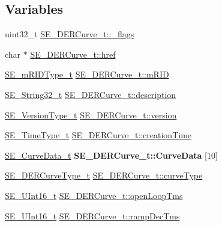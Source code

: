 \subsection*{Variables}
\begin{DoxyCompactItemize}
\item 
uint32\+\_\+t \hyperlink{group__DERCurve_gaed4a71593a5f29f29c53fda240e616e4}{S\+E\+\_\+\+D\+E\+R\+Curve\+\_\+t\+::\+\_\+flags}
\item 
char $\ast$ \hyperlink{group__DERCurve_gae8312bc271b89dbee978056bd65b12bf}{S\+E\+\_\+\+D\+E\+R\+Curve\+\_\+t\+::href}
\item 
\hyperlink{group__mRIDType_gac74622112f3a388a2851b2289963ba5e}{S\+E\+\_\+m\+R\+I\+D\+Type\+\_\+t} \hyperlink{group__DERCurve_gae779658d736d0fcca90bbe1f932ed0b8}{S\+E\+\_\+\+D\+E\+R\+Curve\+\_\+t\+::m\+R\+ID}
\item 
\hyperlink{group__String32_gac9f59b06b168b4d2e0d45ed41699af42}{S\+E\+\_\+\+String32\+\_\+t} \hyperlink{group__DERCurve_ga895686dd6b59302a6afd6695d01db9d9}{S\+E\+\_\+\+D\+E\+R\+Curve\+\_\+t\+::description}
\item 
\hyperlink{group__VersionType_ga4b8d27838226948397ed99f67d46e2ae}{S\+E\+\_\+\+Version\+Type\+\_\+t} \hyperlink{group__DERCurve_gaa0cda98a583e9f6fa1ec89ce6091c496}{S\+E\+\_\+\+D\+E\+R\+Curve\+\_\+t\+::version}
\item 
\hyperlink{group__TimeType_ga6fba87a5b57829b4ff3f0e7638156682}{S\+E\+\_\+\+Time\+Type\+\_\+t} \hyperlink{group__DERCurve_gaa955e114839f61826bb2fb4adabb5923}{S\+E\+\_\+\+D\+E\+R\+Curve\+\_\+t\+::creation\+Time}
\item 
\mbox{\label{group__DERCurve_ga66f35ea6421a3828afeee361d4ce2b0f}} 
\hyperlink{structSE__CurveData__t}{S\+E\+\_\+\+Curve\+Data\+\_\+t} {\bfseries S\+E\+\_\+\+D\+E\+R\+Curve\+\_\+t\+::\+Curve\+Data} \mbox{[}10\mbox{]}
\item 
\hyperlink{group__DERCurveType_gad16d5a3d1a31b3f09dc59e04101c0d8e}{S\+E\+\_\+\+D\+E\+R\+Curve\+Type\+\_\+t} \hyperlink{group__DERCurve_ga076f4efebdfbd4e6e2070fb9d8db7f4a}{S\+E\+\_\+\+D\+E\+R\+Curve\+\_\+t\+::curve\+Type}
\item 
\hyperlink{group__UInt16_gac68d541f189538bfd30cfaa712d20d29}{S\+E\+\_\+\+U\+Int16\+\_\+t} \hyperlink{group__DERCurve_gabd187c05086b853051ae25393be08ef8}{S\+E\+\_\+\+D\+E\+R\+Curve\+\_\+t\+::open\+Loop\+Tms}
\item 
\hyperlink{group__UInt16_gac68d541f189538bfd30cfaa712d20d29}{S\+E\+\_\+\+U\+Int16\+\_\+t} \hyperlink{group__DERCurve_ga727ca3765e8a6f57f39c618c73e3db25}{S\+E\+\_\+\+D\+E\+R\+Curve\+\_\+t\+::ramp\+Dec\+Tms}

\end{DoxyCompactItemize}
